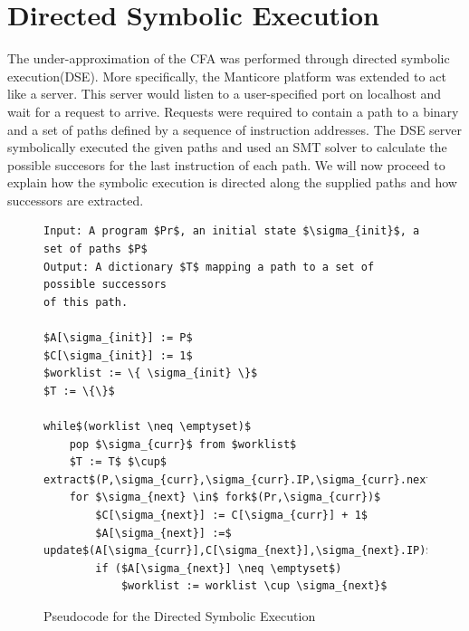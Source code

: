\documentclass{kththesis}
\newcommand{\fbcomment}[1]{{#1}}
\renewcommand{\fbcomment}[1]{}
\begin{document}
\section{Directed Symbolic Execution}\label{sec:DSEPseudo}
\fbcomment{\color{red}Goal: Describe the theory behind how the directed symbolic execution was performed and how successor to locations were extracted.}
The under-approximation of the CFA was performed through directed symbolic execution(DSE). More specifically, the Manticore platform was extended to act like a server. This server would listen to a user-specified port on localhost and wait for a request to arrive. Requests were required to contain a path to a binary and a set of paths defined by a sequence of instruction addresses. The DSE server symbolically executed the given paths and used an SMT solver to calculate the possible succesors for the last instruction of each path. We will now proceed to explain how the symbolic execution is directed along the supplied paths and how successors are extracted.
\begin{figure}[!htbp]
    \centering
\begin{algorithmFrame}
\begin{lstlisting}[style=algorithm]
Input: A program $Pr$, an initial state $\sigma_{init}$, a set of paths $P$
Output: A dictionary $T$ mapping a path to a set of possible successors 
of this path.

$A[\sigma_{init}] := P$
$C[\sigma_{init}] := 1$
$worklist := \{ \sigma_{init} \}$
$T := \{\}$

while$(worklist \neq \emptyset)$
    pop $\sigma_{curr}$ from $worklist$
    $T := T$ $\cup$ extract$(P,\sigma_{curr},\sigma_{curr}.IP,\sigma_{curr}.nextIP,C[\sigma_{curr}])$
    for $\sigma_{next} \in$ fork$(Pr,\sigma_{curr})$
        $C[\sigma_{next}] := C[\sigma_{curr}] + 1$
        $A[\sigma_{next}] :=$ update$(A[\sigma_{curr}],C[\sigma_{next}],\sigma_{next}.IP)$
        if ($A[\sigma_{next}] \neq \emptyset$)
            $worklist := worklist \cup \sigma_{next}$
\end{lstlisting}
\end{algorithmFrame}
\caption[Pseudocode for the Directed Symbolic Execution]{Pseudocode for the Directed Symbolic Execution}
    \label{fig:DSEAlgorithm}
\end{figure}
\end{document}
